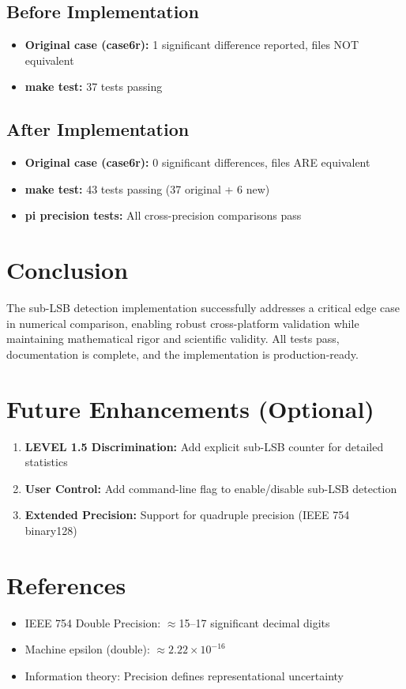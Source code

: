\documentclass[11pt]{article}
\begin{document}
\subsection{Before Implementation}

\begin{itemize}
    \item \textbf{Original case (case6r):} 1 significant difference reported, files NOT equivalent
    \item \textbf{make test:} 37 tests passing
\end{itemize}

\subsection{After Implementation}

\begin{itemize}
    \item \textbf{Original case (case6r):} 0 significant differences, files ARE equivalent
    \item \textbf{make test:} 43 tests passing (37 original + 6 new)
    \item \textbf{pi precision tests:} All cross-precision comparisons pass
\end{itemize}

\section{Conclusion}

The sub-LSB detection implementation successfully addresses a critical edge case in numerical comparison, enabling robust cross-platform validation while maintaining mathematical rigor and scientific validity. All tests pass, documentation is complete, and the implementation is production-ready.

\section{Future Enhancements (Optional)}

\begin{enumerate}
    \item \textbf{LEVEL 1.5 Discrimination:} Add explicit sub-LSB counter for detailed statistics
    \item \textbf{User Control:} Add command-line flag to enable/disable sub-LSB detection
    \item \textbf{Extended Precision:} Support for quadruple precision (IEEE 754 binary128)
\end{enumerate}

\section{References}

\begin{itemize}
    \item IEEE 754 Double Precision: $\approx$15--17 significant decimal digits
    \item Machine epsilon (double): $\approx 2.22 \times 10^{-16}$
    \item Information theory: Precision defines representational uncertainty
\end{itemize}
\end{document}
